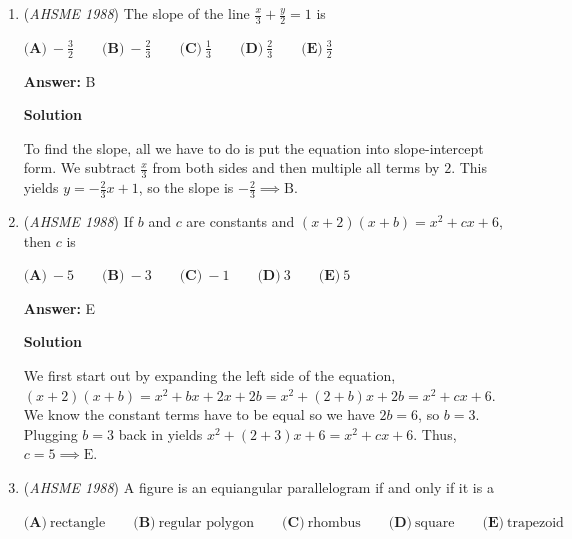 \begin{enumerate}
 $\text{(A)}\ 36 \qquad  \text{(B)}\ 40 \qquad  \text{(C)}\ 44 \qquad  \text{(D)}\ 98 \qquad  \text{(E)}\ 100$

 \textbf{Answer: }A



\textbf{Solution}

We first notice that the paper strips cover up part of the others. Since the width of the overlap is $1$ and the length of the overlap is $1$, the area of each of the strips with the overlap is $(10\cdot 1)-1=9$. Since there are 4 strips, $4\cdot 9=36 \implies \boxed{\text{A}}$.

 


	\item (\textit{AHSME 1988}) The slope of the line $\frac{x}{3} + \frac{y}{2} = 1$ is


 $\textbf{(A)}\ -\frac{3}{2}\qquad \textbf{(B)}\ -\frac{2}{3}\qquad \textbf{(C)}\ \frac{1}{3}\qquad \textbf{(D)}\ \frac{2}{3}\qquad \textbf{(E)}\ \frac{3}{2}$

 \textbf{Answer: }B



\textbf{Solution}

To find the slope, all we have to do is put the equation into slope-intercept form. We subtract $\frac{x}{3}$ from both sides and then multiple all terms by $2$. This yields $y=-\frac{2}{3}x+1$, so the slope is $-\frac{2}{3} \implies \boxed{\text{B}}$.

 


	\item (\textit{AHSME 1988}) If $b$ and $c$ are constants and $(x + 2)(x + b) = x^2 + cx + 6$, then $c$ is


 $\textbf{(A)}\ -5\qquad \textbf{(B)}\ -3\qquad \textbf{(C)}\ -1\qquad \textbf{(D)}\ 3\qquad \textbf{(E)}\ 5$

 \textbf{Answer: }E



\textbf{Solution}

We first start out by expanding the left side of the equation, $(x+2)(x+b)=x^{2}+bx+2x+2b=x^2+(2+b)x+2b=x^2+cx+6$. We know the constant terms have to be equal so we have $2b=6$, so $b=3$. Plugging $b=3$ back in yields $x^2+(2+3)x+6=x^2+cx+6$. Thus, $c=5 \implies \boxed{\text{E}}$.

 


	\item (\textit{AHSME 1988}) A figure is an equiangular parallelogram if and only if it is a


 $\textbf{(A)}\ \text{rectangle}\qquad \textbf{(B)}\ \text{regular polygon}\qquad \textbf{(C)}\ \text{rhombus}\qquad \textbf{(D)}\ \text{square}\qquad \textbf{(E)}\ \text{trapezoid}$


\end{enumerate}
